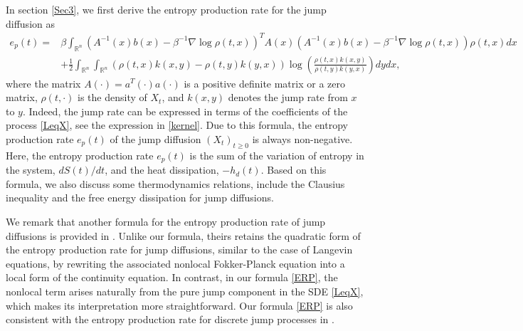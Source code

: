 \documentclass[10pt]{article}
\theoremstyle{definition}
\theoremstyle{remark}
\numberwithin{equation}{section}
\begin{document}
In section \ref{Sec3}, we first derive the entropy production rate for the jump diffusion as
\begin{align}\label{ERP}
    e_p(t) = & \beta \int_{\mathbb{R}^n} (A^{-1}(x)b(x) - \beta^{-1} \nabla \log\rho(t,x))^{T}A(x)(A^{-1}(x)b(x) - \beta^{-1} \nabla \log\rho(t,x)) \rho(t,x)dx \nonumber \\
     &+\frac{1}{2} \int_{\mathbb{R}^n}\int_{\mathbb{R}^n} (\rho(t,x)k(x,y) - \rho(t,y)k(y,x))\log \left( \frac{\rho(t,x)k(x,y)}{\rho(t,y)k(y,x)} \right) dydx,
\end{align}
where the matrix $A(\cdot) = a^T(\cdot)a(\cdot)$ is a positive definite matrix or a zero matrix, $\rho(t,\cdot)$ is the density of $X_t$, and $k(x,y)$ denotes the jump rate from $x$ to $y$. {Indeed, the jump rate can be expressed in terms of the coefficients of the process \eqref{LeqX}, see the expression in \eqref{kernel}.}
Due to this formula, the entropy production rate $e_p(t)$ of the jump diffusion $(X_t)_{t \geq 0}$ is always non-negative.
Here, the entropy production rate $e_p(t)$ is the sum of the variation of entropy in the system, $dS(t)/dt$, and the heat dissipation, $-h_{d}(t)$. Based on this formula, we also discuss some thermodynamics relations, include the Clausius inequality and the free energy dissipation for jump diffusions.

We remark that another formula for the entropy production rate of jump diffusions is provided in \cite{HLMZ25}.
Unlike our formula, theirs retains the quadratic form of the entropy production rate for jump diffusions, similar to the case of Langevin equations, by rewriting the associated nonlocal Fokker-Planck equation into a local form of the continuity equation.
In contrast, in our formula \eqref{ERP}, the nonlocal term arises naturally from the pure jump component in the SDE \eqref{LeqX}, which makes its interpretation more straightforward. Our formula \eqref{ERP} is also consistent with the entropy production rate for discrete jump processes in \cite{MN03}.
\end{document}
